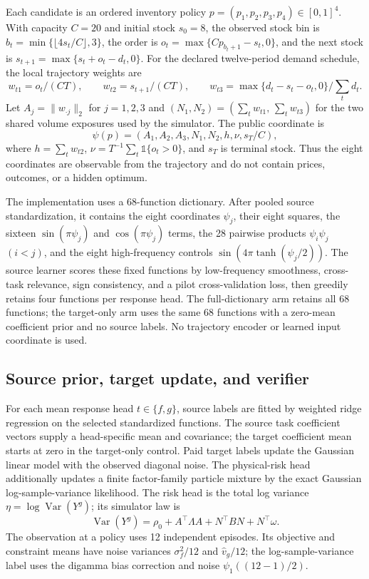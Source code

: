 \documentclass[opre,dblanonrev]{informs4}
\begin{document}
Each candidate is an ordered inventory policy
$p=(p_1,p_2,p_3,p_4)\in[0,1]^4$.  With capacity $C=20$ and initial stock
$s_0=8$, the observed stock bin is
$b_t=\min\{\lfloor 4s_t/C\rfloor,3\}$, the order is
$o_t=\max\{Cp_{b_t+1}-s_t,0\}$, and the next stock is
$s_{t+1}=\max\{s_t+o_t-d_t,0\}$.  For the declared twelve-period demand schedule,
the local trajectory weights are
\[
w_{t1}=o_t/(C T),\qquad w_{t2}=s_{t+1}/(C T),\qquad
w_{t3}=\max\{d_t-s_t-o_t,0\}/\sum_t d_t.
\]
Let $A_j=\|w_{\cdot j}\|_2$ for $j=1,2,3$ and
$(N_1,N_2)=(\sum_t w_{t1},\,\sum_t w_{t3})$ for the
two shared volume exposures used by the simulator.  The public coordinate is
\[
\psi(p)=(A_1,A_2,A_3,N_1,N_2,h,\nu,s_T/C),
\]
where $h=\sum_t w_{t2}$, $\nu=T^{-1}\sum_t\mathbb{1}\{o_t>0\}$, and
$s_T$ is terminal stock.  Thus the eight coordinates are observable from the
trajectory and do not contain prices, outcomes, or a hidden optimum.

The implementation uses a 68-function dictionary.  After pooled source
standardization, it contains the eight coordinates $\psi_j$, their eight squares,
the sixteen $\sin(\pi\psi_j)$ and $\cos(\pi\psi_j)$ terms, the 28 pairwise
products $\psi_i\psi_j$ $(i<j)$, and the eight high-frequency controls
$\sin(4\pi\tanh(\psi_j/2))$.  The source learner scores these fixed functions by
low-frequency smoothness, cross-task relevance, sign consistency, and a pilot
cross-validation loss, then greedily retains four functions per response head.
The full-dictionary arm retains all 68 functions; the target-only arm uses the
same 68 functions with a zero-mean coefficient prior and no source labels.
No trajectory encoder or learned input coordinate is used.

\subsection{Source prior, target update, and verifier}

For each mean response head $t\in\{f,g\}$, source labels are fitted by
weighted ridge regression on the selected standardized functions.  The source
task coefficient vectors supply a head-specific mean and covariance; the target
coefficient mean starts at zero in the target-only control.  Paid target labels
update the Gaussian linear model with the observed diagonal noise.  The
physical-risk head additionally updates a finite factor-family particle mixture
by the exact Gaussian log-sample-variance likelihood.  The risk head is the total log variance
$\eta=\log\operatorname{Var}(Y^g)$; its simulator law is
\[
\operatorname{Var}(Y^g)=\rho_0+A^\top\Lambda A+N^\top B N+N^\top\omega.
\]
The observation at a policy uses 12 independent episodes.  Its objective and
constraint means have noise variances $\sigma_f^2/12$ and $\widehat v_g/12$;
the log-sample-variance label uses the digamma bias correction and noise
$\psi_1((12-1)/2)$.
\end{document}
